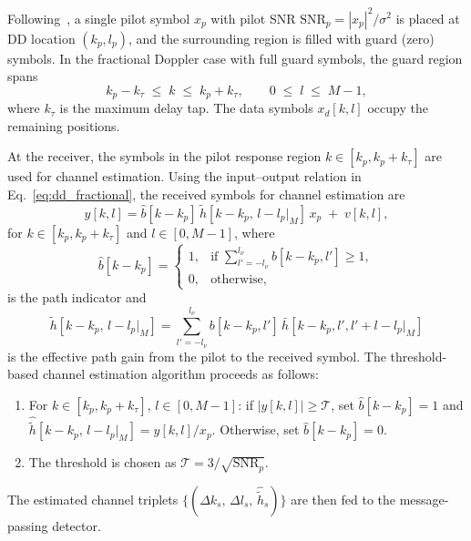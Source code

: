 \documentclass[11pt,a4paper]{article}
\begin{document}
Following~\cite{raviteja_tvt2019}, a single pilot symbol $x_p$ with
pilot SNR $\mathrm{SNR}_p = |x_p|^2/\sigma^2$ is placed at DD
location $(k_p,l_p)$, and the surrounding region is filled with guard
(zero) symbols. In the fractional Doppler case with full guard symbols,
the guard region spans
\begin{equation}
  k_p - k_\tau \;\le\; k \;\le\; k_p + k_\tau, \qquad
  0 \;\le\; l \;\le\; M-1,
\end{equation}
where $k_\tau$ is the maximum delay tap. The data symbols $x_d[k,l]$
occupy the remaining positions.

At the receiver, the symbols in the pilot response region
$k \in [k_p, k_p+k_\tau]$ are used for channel estimation. Using the
input--output relation in Eq.~\eqref{eq:dd_fractional}, the received
symbols for channel estimation are
\begin{equation}
  y[k,l] = \hat{b}[k-k_p]\,
  \tilde{h}[k-k_p,\,l-l_p|_M]\,x_p \;+\; v[k,l],
  \label{eq:ce_rx}
\end{equation}
for $k \in [k_p, k_p+k_\tau]$ and $l \in [0,M-1]$, where
\begin{equation}
  \hat{b}[k-k_p] =
  \begin{cases}
    1, & \text{if } \displaystyle\sum_{l'=-l_\nu}^{l_\nu}
         b[k-k_p,l'] \ge 1, \\
    0, & \text{otherwise},
  \end{cases}
\end{equation}
is the path indicator and
\begin{equation}
  \tilde{h}[k-k_p,\,l-l_p|_M]
  = \sum_{l'=-l_\nu}^{l_\nu}
  b[k-k_p,l']\,\bar{h}[k-k_p,l',l'+l-l_p|_M]
\end{equation}
is the effective path gain from the pilot to the received symbol. The
threshold-based channel estimation algorithm proceeds as follows:
\begin{enumerate}
  \item For $k\in[k_p, k_p+k_\tau]$, $l\in[0,M-1]$: if
    $|y[k,l]| \ge \mathcal{T}$, set
    $\hat{b}[k-k_p]=1$ and
    $\hat{\tilde{h}}[k-k_p,\,l-l_p|_M] = y[k,l]/x_p$.
    Otherwise, set $\hat{b}[k-k_p]=0$.
  \item The threshold is chosen as
    $\mathcal{T} = 3/\sqrt{\mathrm{SNR}_p}$.
\end{enumerate}
The estimated channel triplets
$\{(\Delta k_s,\,\Delta l_s,\,\hat{\tilde{h}}_s)\}$ are then fed to
the message-passing detector.

\end{document}

